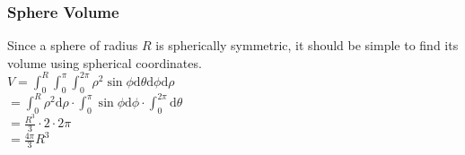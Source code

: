 \subsubsection{Sphere Volume}
\noindent
Since a sphere of radius $R$ is spherically symmetric, it should be simple to find its volume using spherical coordinates.\\
\indent
$V = \int_{0}^{R}{\int_{0}^{\pi}{\int_{0}^{2\pi}{\rho^2\sin{\phi}\mathrm{d}\theta}\mathrm{d}\phi}\mathrm{d}\rho}$\\
\indent
$= \int_{0}^{R}{\rho^2\mathrm{d}\rho} \cdot \int_{0}^{\pi}{\sin{\phi}\mathrm{d}\phi} \cdot \int_{0}^{2\pi}{\mathrm{d}\theta}$\\
\indent
$= \frac{R^3}{3} \cdot 2 \cdot 2\pi$\\
\indent
$= \frac{4\pi}{3}R^3$\\